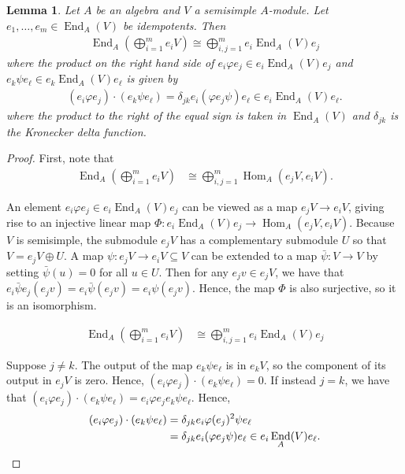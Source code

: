 \documentclass[10pt]{amsart}
\theoremstyle{definition}
\theoremstyle{definition}
\theoremstyle{plain}
\newtheorem{lemma}[lemma]{Lemma}
\theoremstyle{remark}
\theoremstyle{plain}
\theoremstyle{plain}
\newcommand{\ov}[1]{\bar{#1}}
\DeclareMathOperator{\End}{End}
\DeclareMathOperator{\Hom}{Hom}
\begin{document}
\begin{lemma}\label{lem:decompose_by_idempotents} Let $A$ be an algebra and $V$ a semisimple $A$-module. Let $e_1,\dots,e_m\in\End_A(V)$ be idempotents. Then \begin{align*}
    \End_A\left(\bigoplus_{i=1}^me_i V\right)\cong \bigoplus_{i,j=1}^m e_i\End_A(V) e_j
\end{align*} where the product on the right hand side of $e_i\varphi e_j\in e_i\End_A(V)e_j$ and $e_k\psi e_\ell\in e_k\End_A(V)e_\ell$ is given by \begin{align*}
    (e_i\varphi e_j)\cdot(e_k\psi e_\ell)=\delta_{jk}e_i(\varphi e_j\psi)e_\ell\in e_i\End_A(V) e_\ell.
\end{align*} where the product to the right of the equal sign is taken in $\End_A(V)$ and $\delta_{jk}$ is the Kronecker delta function.
\end{lemma}

\begin{proof}
First, note that \begin{align*}
    \End_A\left(\bigoplus_{i=1}^me_i V\right)&\cong\bigoplus_{i,j=1}^m \Hom_A(e_j V, e_i V).
\end{align*}

An element $e_i\varphi e_j\in e_i\End_A(V) e_j$ can be viewed as a map $e_j V\to e_i V$, giving rise to an injective linear map $\Phi:e_i\End_A(V)e_j\to \Hom_A(e_jV, e_i V)$. Because $V$ is semisimple, the submodule $e_jV$ has a complementary submodule $U$ so that $V=e_j V\oplus U$. A map $\psi:e_j V\to e_iV\subseteq V$ can be extended to a map $\ov\psi:V\to V$ by setting $\ov\psi(u)=0$ for all $u\in U$. Then for any $e_jv\in e_jV$, we have that $e_i\ov\psi e_j(e_jv)=e_i\ov\psi(e_jv)=e_i\psi(e_jv)$. Hence, the map $\Phi$ is also surjective, so it is an isomorphism.

    \begin{align*}
        \End_A\left(\bigoplus_{i=1}^me_i V\right)&\cong\bigoplus_{i,j=1}^m e_i\End_A(V)e_j
    \end{align*}

    Suppose $j\neq k$. The output of the map $e_k\psi e_\ell$ is in $e_k V$, so the component of its output in $e_j V$ is zero. Hence, $(e_i\varphi e_j)\cdot(e_k\psi e_\ell)=0$. If instead $j=k$, we have that $(e_i\varphi e_j)\cdot(e_k\psi e_\ell)=e_i\varphi e_j e_k\psi e_\ell$. Hence, \begin{align*}
        (e_i\varphi e_j)\cdot(e_k\psi e_\ell)&=\delta_{jk}e_i\varphi (e_j)^2\psi e_\ell\\
        &=\delta_{jk}e_i(\varphi e_j\psi)e_\ell\in e_i\End_A(V) e_\ell. \qedhere
    \end{align*}
\end{proof}
\end{document}
